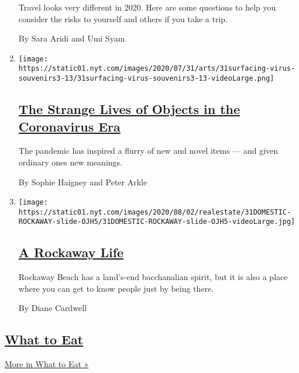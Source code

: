 \begin{enumerate}
  Travel looks very different in 2020. Here are some questions to help
  you consider the risks to yourself and others if you take a trip.

  By Sara Aridi and Umi Syam
\item
  \texttt{[image: https://static01.nyt.com/images/2020/07/31/arts/31surfacing-virus-souvenirs3-13/31surfacing-virus-souvenirs3-13-videoLarge.png]}

  \hypertarget{the-strange-lives-of-objects-in-the-coronavirus-era}{%
  \subsection{\texorpdfstring{\href{/2020/08/01/arts/design/virus-design-objects.html}{The
  Strange Lives of Objects in the Coronavirus
  Era}}{The Strange Lives of Objects in the Coronavirus Era}}\label{the-strange-lives-of-objects-in-the-coronavirus-era}}

  The pandemic has inspired a flurry of new and novel items --- and
  given ordinary ones new meanings.

  By Sophie Haigney and Peter Arkle
\item
  \texttt{[image: https://static01.nyt.com/images/2020/08/02/realestate/31DOMESTIC-ROCKAWAY-slide-OJH5/31DOMESTIC-ROCKAWAY-slide-OJH5-videoLarge.jpg]}

  \hypertarget{a-rockaway-life}{%
  \subsection{\texorpdfstring{\href{/2020/07/31/realestate/a-rockaway-beach-queens-life.html}{A
  Rockaway Life}}{A Rockaway Life}}\label{a-rockaway-life}}

  Rockaway Beach has a land's-end bacchanalian spirit, but it is also a
  place where you can get to know people just by being there.

  By Diane Cardwell
\end{enumerate}

\hypertarget{what-to-eat}{%
\subsection{\texorpdfstring{\href{/spotlight/what-to-eat}{What to
Eat}}{What to Eat}}\label{what-to-eat}}

\href{/spotlight/what-to-eat}{More in What to Eat »}


